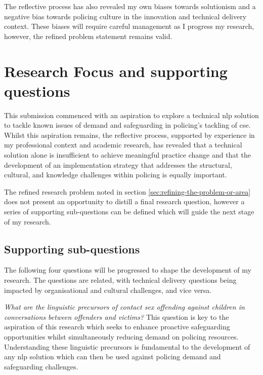\documentclass[12pt,a4paper,oneside]{report}
\begin{document}
The reflective process has also revealed my own biases towards solutionism and a negative bias towards policing culture in the innovation and technical delivery context.  These biases will require careful management as I progress my research, however, the refined problem statement remains valid.

\chapter{Research Focus and supporting questions}  
\label{ch:research-focus-and-questions}
This submission commenced with an aspiration to explore a technical \gls{nlp} solution to tackle known issues of demand and safeguarding in policing's tackling of \gls{cse}.  Whilst this aspiration remains, the reflective process, supported by experience in my professional context and academic research, has revealed that a technical solution alone is insufficient to achieve meaningful practice change and that the development of an implementation strategy that addresses the structural, cultural, and knowledge challenges within policing is equally important.  

The refined research problem noted in section \ref{sec:refining-the-problem-or-area} does not present an opportunity to distill a final research question, however a series of supporting sub-questions can be defined which will guide the next stage of my research.

\section{Supporting sub-questions}
\label{sec:supporting-sub-questions}

The following four questions will be progressed to shape the development of my research.  The questions are related, with technical delivery questions being impacted by organisational and cultural challenges, and vice versa.

\textit{What are the linguistic precursors of contact sex offending against children in conversations between offenders and victims?}
This question is key to the aspiration of this research which seeks to enhance proactive safeguarding opportunities whilst simultaneously reducing demand on policing resources.  Understanding these linguistic precursors is fundamental to the development of any \gls{nlp} solution which can then be used against policing demand and safeguarding challenges.
\end{document}
